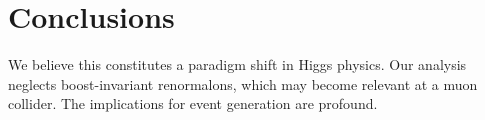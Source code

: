 \section{Conclusions}\label{sec:conclusions}

We believe this constitutes a paradigm shift in Higgs physics. Our
analysis neglects boost-invariant renormalons, which may become relevant
at a muon collider. The implications for event generation are profound.


